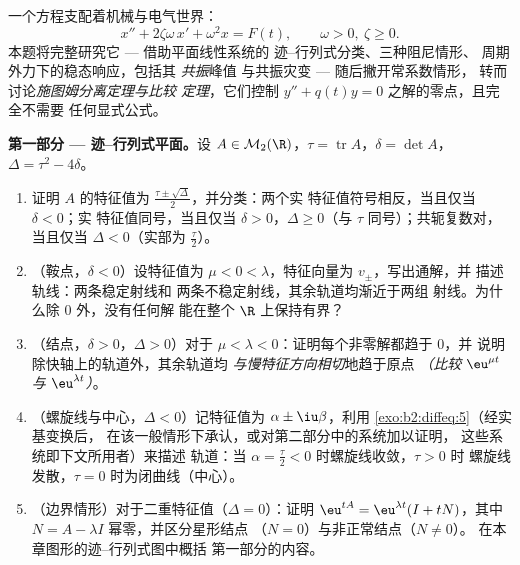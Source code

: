 \begin{problem}\label{pb:b2:diffeq:1}
一个方程支配着机械与电气世界：
\[
x'' + 2\zeta\omega\,x' + \omega^2 x = F(t),
\qquad \omega > 0,\ \zeta \geq 0 .
\]
本题将完整研究它 --- 借助平面线性系统的
迹--行列式分类、三种阻尼情形、
周期外力下的稳态响应，包括其
\emph{共振}峰值
与共振灾变 --- 随后撇开常系数情形，
转而讨论\emph{施图姆分离定理与比较
定理}，它们控制
$y'' + q(t)y = 0$ 之解的零点，且完全不需要
任何显式公式。

\medskip
\noindent\textbf{第一部分 --- 迹--行列式平面。}设
$A \in \mathcal M_2(\R)$，$\tau = \operatorname{tr}A$，$\delta
= \det A$，$\Delta = \tau^2 - 4\delta$。
\begin{enumerate}
  \item 证明 $A$ 的特征值为
        $\frac{\tau\pm\sqrt\Delta}{2}$，并分类：两个实
        特征值符号相反，当且仅当 $\delta < 0$；实
        特征值同号，当且仅当 $\delta > 0$，$\Delta
        \geq 0$（与 $\tau$ 同号）；共轭复数对，当且仅当
        $\Delta < 0$（实部为 $\frac\tau2$）。
  \item （鞍点，$\delta < 0$）设特征值为 $\mu < 0 <
        \lambda$，特征向量为 $v_\pm$，写出通解，并
        描述轨线：两条稳定射线和
        两条不稳定射线，其余轨道均渐近于两组
        射线。为什么除 $0$ 外，没有任何解
        能在整个 $\R$ 上保持有界？
  \item （结点，$\delta > 0$，$\Delta > 0$）对于 $\mu < \lambda
        < 0$：证明每个非零解都趋于 $0$，并
        说明除快轴上的轨道外，其余轨道均
        \emph{与慢特征方向相切}地趋于原点
        \emph{（比较 $\eu^{\mu t}$ 与 $\eu^{\lambda t}$）}。
  \item （螺旋线与中心，$\Delta < 0$）记特征值为
        $\alpha \pm \iu\beta$，利用
        \cref{exo:b2:diffeq:5}（经实基变换后，
        在该一般情形下承认，或对第二部分中的系统加以证明，
        这些系统即下文所用者）来描述
        轨道：当 $\alpha =
        \frac\tau2 < 0$ 时螺旋线收敛，$\tau > 0$ 时
        螺旋线发散，$\tau = 0$ 时为闭曲线（中心）。
  \item （边界情形）对于二重特征值（$\Delta =
        0$）：证明 $\eu^{tA} = \eu^{\lambda t}(I + tN)$，其中 $N
        = A - \lambda I$ 幂零，并区分星形结点
        （$N = 0$）与非正常结点（$N \neq 0$）。
        在本章图形的迹--行列式图中概括
        第一部分的内容。
\end{enumerate}


\end{problem}
